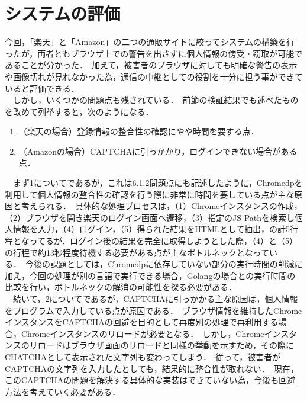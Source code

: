 \documentclass[dvipdfmx]{jsarticle}
\begin{document}
        \section{システムの評価}
            今回，「楽天」と「Amazon」の二つの通販サイトに絞ってシステムの構築を行ったが，両者ともブラウザ上での警告を出さずに個人情報の傍受・窃取が可能であることが分かった．\
            加えて，被害者のブラウザに対しても明確な警告の表示や画像切れが見れなかった為，通信の中継としての役割を十分に担う事ができていると評価できる．\\
            　しかし，いくつかの問題点も残されている．\
            前節の検証結果でも述べたものを改めて列挙すると，次のようになる．\
            \begin{enumerate}
                \item （楽天の場合）登録情報の整合性の確認にやや時間を要する点．
                \item （Amazonの場合）CAPTCHAに引っかかり，ログインできない場合がある点．
            \end{enumerate}
            　まず1についてであるが，これは6.1.2問題点にも記述したように，Chromedpを利用して個人情報の整合性の確認を行う際に非常に時間を要している点が主な原因と考えられる．\
            具体的な処理プロセスは，（1）Chromeインスタンスの作成，（2）ブラウザを開き楽天のログイン画面へ遷移，（3）指定のJS Pathを検索し個人情報を入力，（4）ログイン，（5）得られた結果をHTMLとして抽出，の計5行程となってるが．ログイン後の結果を完全に取得しようとした際，（4）と（5）の行程で約13秒程度待機する必要がある点が主なボトルネックとなっている．\
            今後の課題としては，Chromedpに依存していない部分の実行時間の削減に加え，今回の処理が別の言語で実行できる場合，Golangの場合との実行時間の比較を行い，ボトルネックの解消の可能性を探る必要がある．\\
            　続いて，2についてであるが，CAPTCHAに引っかかる主な原因は，個人情報をプログラムで入力している点が原因である．\
            ブラウザ情報を維持したChromeインスタンスをCAPTCHAの回避を目的として再度別の処理で再利用する場合，Chromeインスタンスのリロードが必要となる．\
            しかし，Chromeインスタンスのリロードはブラウザ画面のリロードと同様の挙動を示すため，その際にCHATCHAとして表示された文字列も変わってしまう．\
            従って，被害者がCAPTCHAの文字列を入力したとしても，結果的に整合性が取れない．\
            現在，このCAPTCHAの問題を解決する具体的な実装はできていない為，今後も回避方法を考えていく必要がある．\
\end{document}
